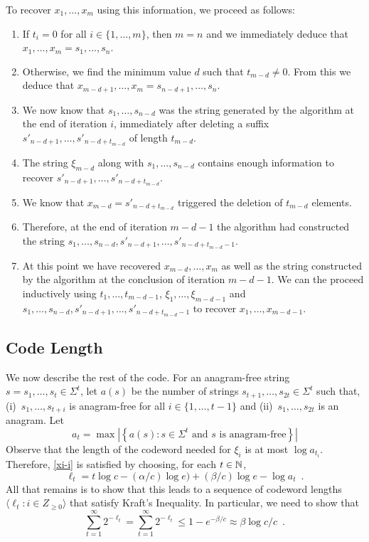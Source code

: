 \documentclass{patmorin}
\begin{document}
To recover $x_1,\ldots,x_m$ using this information, we proceed as follows:
\begin{enumerate}
  \item If $t_i=0$ for all $i\in\{1,\ldots,m\}$, then $m=n$ and we immediately deduce that $x_1,\ldots,x_m=s_1,\ldots,s_n$.
  \item Otherwise, we find the minimum value $d$ such that $t_{m-d}\neq 0$.  
  From this we deduce that $x_{m-d+1},\ldots,x_m = s_{n-d+1},\ldots,s_n$.
  \item We now know that $s_1,\ldots,s_{n-d}$ was the string generated by the algorithm at the end of iteration $i$, immediately after deleting a suffix $s'_{n-d+1},\ldots,s'_{n-d+t_{m-d}}$ of length $t_{m-d}$.
  \item The string $\xi_{m-d}$ along with $s_1,\ldots,s_{n-d}$ contains enough information to recover $s'_{n-d+1},\ldots,s'_{n-d+t_{m-d}}$.
  \item We know that $x_{m-d} = s'_{n-d+t_{m-d}}$ triggered the deletion of $t_{m-d}$ elements.
  \item Therefore, at the end of iteration $m-d-1$ the algorithm had constructed the string $s_1,\ldots,s_{n-d},s'_{n-d+1},\ldots,s'_{n-d+t_{m-d}-1}$.
  \item At this point we have recovered $x_{m-d},\ldots,x_m$ as well as the string constructed by the algorithm at the conclusion of iteration $m-d-1$.  We can the proceed inductively using $t_1,\ldots,t_{m-d-1}$, $\xi_1,\ldots,\xi_{m-d-1}$ and $s_1,\ldots,s_{n-d},s'_{n-d+1},\ldots,s'_{n-d+t_{m-d}-1}$ to recover $x_1,\ldots,x_{m-d-1}$.
\end{enumerate}

\subsection{Code Length}

We now describe the rest of the code.  For an anagram-free string $s=s_1,\ldots,s_t\in \Sigma^{t}$, let $a(s)$ be the number of strings $s_{t+1},\ldots,s_{2t}\in\Sigma^t$ such that, (i)~$s_1,\ldots,s_{t+i}$ is anagram-free for all $i\in\{1,\ldots,t-1\}$ and (ii)~$s_1,\ldots,s_{2t}$ is an anagram.  Let 
\[
   a_t = \max\left|\left\{a(s) : \text{$s\in \Sigma^t$ and $s$ is anagram-free} \right\}\right|
\]
Observe that the length of the codeword needed for $\xi_i$ is at most $\log a_{t_i}$.  Therefore, \eqref{xi-i} is satisfied by choosing, for each $t\in \mathbb{N}$,
\[
   \ell_t = t\log c - (\alpha/c)\log e) + (\beta/c)\log e - \log a_t   \enspace .
\]
All that remains is to show that this leads to a sequence of codeword lengths $\langle \ell_t : i\in Z_{\ge 0}\rangle$ that satisfy Kraft's Inequality.  In particular, we need to show that
\[
  \sum_{t=1}^\infty 2^{-\ell_t} = \sum_{t=1}^\infty 2^{-\ell_t} \le 1-e^{-\beta/c} \approx \beta\log c/c \enspace .
\]
\end{document}
